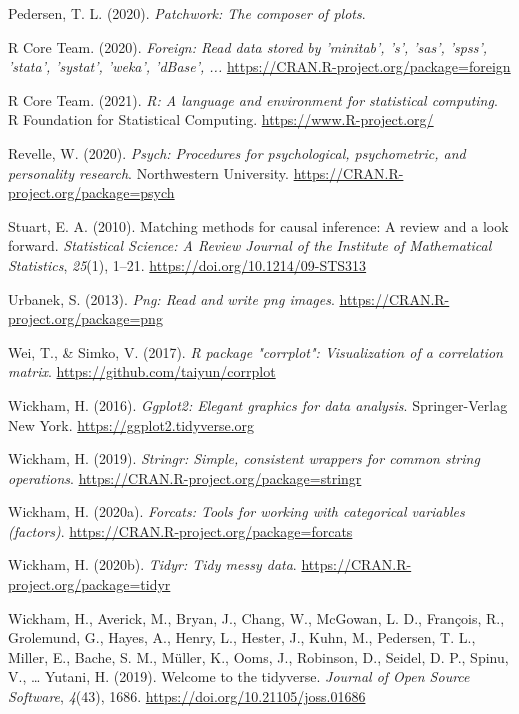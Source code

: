 \begin{appendix}
\leavevmode\hypertarget{ref-R-patchwork}{}%
Pedersen, T. L. (2020). \emph{Patchwork: The composer of plots}.

\leavevmode\hypertarget{ref-R-foreign}{}%
R Core Team. (2020). \emph{Foreign: Read data stored by 'minitab', 's',
'sas', 'spss', 'stata', 'systat', 'weka', 'dBase', ...}
\url{https://CRAN.R-project.org/package=foreign}

\leavevmode\hypertarget{ref-R-base}{}%
R Core Team. (2021). \emph{R: A language and environment for statistical
computing}. R Foundation for Statistical Computing.
\url{https://www.R-project.org/}

\leavevmode\hypertarget{ref-R-psych}{}%
Revelle, W. (2020). \emph{Psych: Procedures for psychological,
psychometric, and personality research}. Northwestern University.
\url{https://CRAN.R-project.org/package=psych}

\leavevmode\hypertarget{ref-stuartMatchingMethodsCausal2010}{}%
Stuart, E. A. (2010). Matching methods for causal inference: A review
and a look forward. \emph{Statistical Science: A Review Journal of the
Institute of Mathematical Statistics}, \emph{25}(1), 1--21.
\url{https://doi.org/10.1214/09-STS313}

\leavevmode\hypertarget{ref-R-png}{}%
Urbanek, S. (2013). \emph{Png: Read and write png images}.
\url{https://CRAN.R-project.org/package=png}

\leavevmode\hypertarget{ref-R-corrplot2017}{}%
Wei, T., \& Simko, V. (2017). \emph{R package "corrplot": Visualization
of a correlation matrix}. \url{https://github.com/taiyun/corrplot}

\leavevmode\hypertarget{ref-R-ggplot2}{}%
Wickham, H. (2016). \emph{Ggplot2: Elegant graphics for data analysis}.
Springer-Verlag New York. \url{https://ggplot2.tidyverse.org}

\leavevmode\hypertarget{ref-R-stringr}{}%
Wickham, H. (2019). \emph{Stringr: Simple, consistent wrappers for
common string operations}.
\url{https://CRAN.R-project.org/package=stringr}

\leavevmode\hypertarget{ref-R-forcats}{}%
Wickham, H. (2020a). \emph{Forcats: Tools for working with categorical
variables (factors)}. \url{https://CRAN.R-project.org/package=forcats}

\leavevmode\hypertarget{ref-R-tidyr}{}%
Wickham, H. (2020b). \emph{Tidyr: Tidy messy data}.
\url{https://CRAN.R-project.org/package=tidyr}

\leavevmode\hypertarget{ref-R-tidyverse}{}%
Wickham, H., Averick, M., Bryan, J., Chang, W., McGowan, L. D.,
François, R., Grolemund, G., Hayes, A., Henry, L., Hester, J., Kuhn, M.,
Pedersen, T. L., Miller, E., Bache, S. M., Müller, K., Ooms, J.,
Robinson, D., Seidel, D. P., Spinu, V., \ldots{} Yutani, H. (2019).
Welcome to the tidyverse. \emph{Journal of Open Source Software},
\emph{4}(43), 1686. \url{https://doi.org/10.21105/joss.01686}


\end{appendix}
